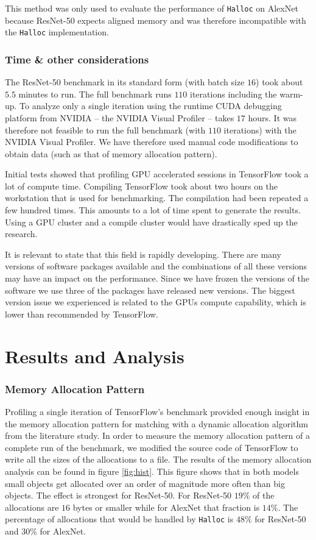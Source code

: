 \documentclass[12pt,twoside]{article}
\begin{document}
This method was only used to evaluate the performance of \texttt{Halloc} on AlexNet because ResNet-50 expects aligned memory and was therefore incompatible with the \texttt{Halloc} implementation.

\subsubsection*{Time \& other considerations}

The ResNet-50 benchmark in its standard form (with batch size $16$) took about $5.5$ minutes to run. The full benchmark runs $110$ iterations including the warm-up. To analyze only a single iteration using the runtime CUDA debugging platform from NVIDIA -- the NVIDIA Visual Profiler -- takes $17$ hours. It was therefore not feasible to run the full benchmark (with $110$ iterations) with the NVIDIA Visual Profiler. We have therefore used manual code modifications to obtain data (such as that of memory allocation pattern).

Initial tests showed that profiling GPU accelerated sessions in TensorFlow took a lot of compute time. Compiling TensorFlow took about two hours on the workstation that is used for benchmarking. The compilation had been repeated a few hundred times. This amounts to a lot of time spent to generate the results. Using a GPU cluster and a compile cluster would have drastically sped up the research.

It is relevant to state that this field is rapidly developing. There are many versions of software packages available and the combinations of all these versions may have an impact on the performance. Since we have frozen the versions of the software we use three of the packages have released new versions. The biggest version issue we experienced is related to the GPUs compute capability, which is lower than recommended by TensorFlow.

\section{Results and Analysis}
\label{sec:results-and-analysis}

\subsubsection*{Memory Allocation Pattern}
Profiling a single iteration of TensorFlow's benchmark provided enough insight in the memory allocation pattern for matching with a dynamic allocation algorithm from the literature study. In order to measure the memory allocation pattern of a complete run of the benchmark, we modified the source code of TensorFlow to write all the sizes of the allocations to a file. The results of the memory allocation analysis can be found in figure \ref{fig:hist}. This figure shows that in both models small objects get allocated over an order of magnitude more often than big objects. The effect is strongest for ResNet-50. For ResNet-50 $19\%$ of the allocations are $16$ bytes or smaller while for AlexNet that fraction is $14\%$. The percentage of allocations that would be handled by \texttt{Halloc} is $48\%$ for ResNet-50 and $30\%$ for AlexNet.
\end{document}

